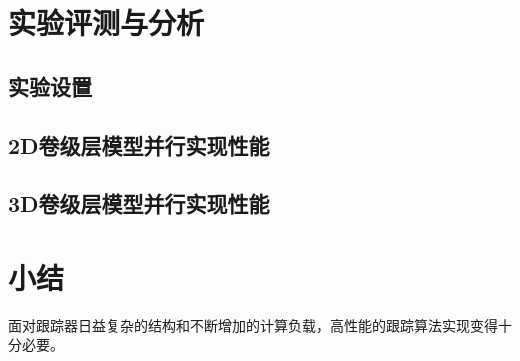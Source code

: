 \section{实验评测与分析}

\subsection{实验设置}

\subsection{2D卷级层模型并行实现性能}

\subsection{3D卷级层模型并行实现性能}


\section{小结}
面对跟踪器日益复杂的结构和不断增加的计算负载，高性能的跟踪算法实现变得十分必要。
